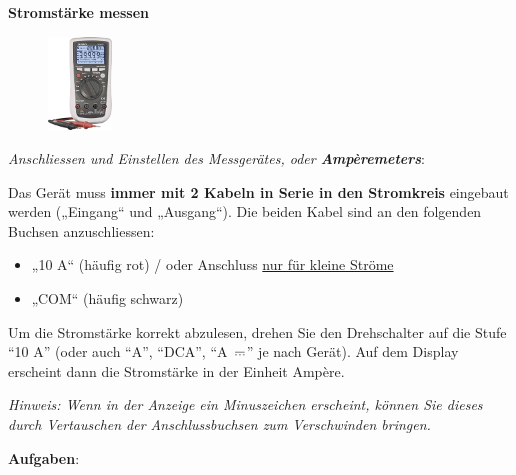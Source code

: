 \documentclass[11pt]{article}
\newcommand{\textdirectcurrent}{%
  \settowidth{\dimen0}{$=$}%
  \vbox to .85ex {\offinterlineskip
    \hbox to \dimen0{\leaders\hrule\hfill}
    \vskip.35ex
    \hbox to \dimen0{%
      \leaders\hrule\hskip.2\dimen0\hfill
      \leaders\hrule\hskip.2\dimen0\hfill
      \leaders\hrule\hskip.2\dimen0
    }
    \vfill
  }%
}
\newcommand{\mathdirectcurrent}{\mathrel{\textdirectcurrent}}
\begin{document}
\begin{tcolorbox}[width=\textwidth, %
    colback=white,colframe=gray!75!black]


\textbf{Stromstärke messen}

\begin{figure}
\vspace{-12pt}
  \centering
    \includegraphics[width=0.15\textwidth]{images/multimeter-vc-870.png}
\end{figure}

\textit{Anschliessen und Einstellen des Messgerätes, oder \textbf{Ampèremeters}}:


Das Gerät muss \textbf{immer mit 2 Kabeln in Serie in den Stromkreis} eingebaut werden („Eingang“ und  „Ausgang“). 
Die beiden Kabel sind an den folgenden Buchsen anzuschliessen: 


\begin{itemize}[label={--}]
    \item „10 A“   (häufig rot) / oder Anschluss \underline{nur für kleine Ströme}
    \item „COM“  (häufig schwarz)
\end{itemize}


Um die Stromstärke korrekt abzulesen, drehen Sie den Drehschalter auf die Stufe ``10 A'' (oder auch ``A'', ``DCA'',  ``A~$\mathdirectcurrent$''  je nach Gerät). Auf dem Display erscheint dann die Stromstärke in der Einheit Ampère. \vspace{0.2cm}

\textit{Hinweis: Wenn in der Anzeige ein Minuszeichen erscheint, können Sie dieses durch Vertauschen der Anschlussbuchsen zum Verschwinden bringen.}

\end{tcolorbox}


\vspace{0.5cm}
\textbf{Aufgaben}:
\end{document}
